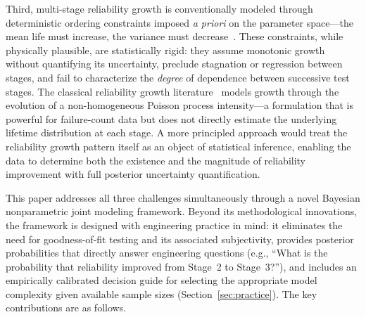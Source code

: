 \documentclass[a4paper,fleqn,longmktitle]{cas-sc}
\begin{document}
Third, multi-stage reliability growth is conventionally modeled through deterministic ordering constraints imposed \emph{a priori} on the parameter space---the mean life must increase, the variance must decrease~\cite{Liu2026a,Liu2026b}. These constraints, while physically plausible, are statistically rigid: they assume monotonic growth without quantifying its uncertainty, preclude stagnation or regression between stages, and fail to characterize the \emph{degree} of dependence between successive test stages. The classical reliability growth literature~\cite{Duane1964,Crow1974,Crow1984,Hall1998} models growth through the evolution of a non-homogeneous Poisson process intensity---a formulation that is powerful for failure-count data but does not directly estimate the underlying lifetime distribution at each stage. A more principled approach would treat the reliability growth pattern itself as an object of statistical inference, enabling the data to determine both the existence and the magnitude of reliability improvement with full posterior uncertainty quantification.

This paper addresses all three challenges simultaneously through a novel Bayesian nonparametric joint modeling framework. Beyond its methodological innovations, the framework is designed with engineering practice in mind: it eliminates the need for goodness-of-fit testing and its associated subjectivity, provides posterior probabilities that directly answer engineering questions (e.g., ``What is the probability that reliability improved from Stage~2 to Stage~3?''), and includes an empirically calibrated decision guide for selecting the appropriate model complexity given available sample sizes (Section~\ref{sec:practice}). The key contributions are as follows.
\end{document}
